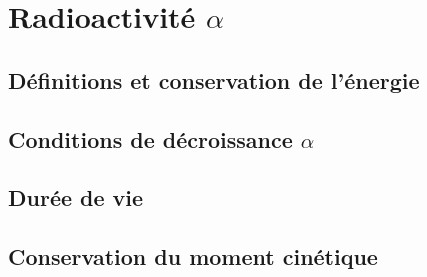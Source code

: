 \chapter{Radioactivité $\alpha$}
\section{Définitions et conservation de l'énergie}
\section{Conditions de décroissance $\alpha$}
\section{Durée de vie}
\section{Conservation du moment cinétique}
